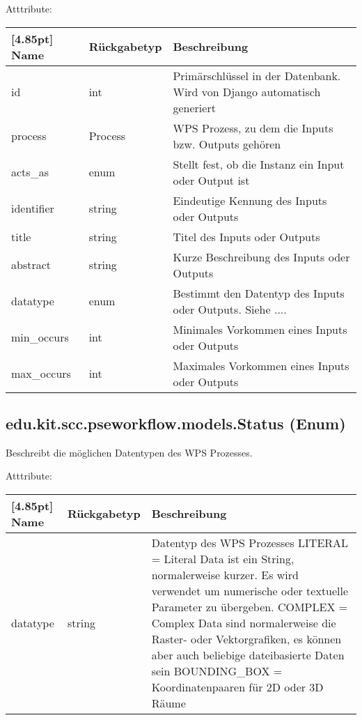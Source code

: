 			Atttribute:
			\begin{center}
				\setlength\tabcolsep{5pt}
				\renewcommand{\arraystretch}{1.5}
				
				\begin{tabularx}{\textwidth}{|l|l|X|}
					\hline
					\rowcolor[gray]{0.75}[4.85pt]
					Name & Rückgabetyp & Beschreibung \\ \hline 
					id & int & Primärschlüssel in der Datenbank. Wird von Django automatisch generiert \\ \hline
					process & Process & WPS Prozess, zu dem die Inputs bzw. Outputs gehören \\ \hline
					acts_as & enum & Stellt fest, ob die Instanz ein Input oder Output ist \\ \hline
					identifier & string & Eindeutige Kennung des Inputs oder Outputs \\ \hline
					title & string & Titel des Inputs oder Outputs \\ \hline
					abstract & string & Kurze Beschreibung des Inputs oder Outputs \\ \hline
					datatype & enum & Bestimmt den Datentyp des Inputs oder Outputs. 
					Siehe .... \\ \hline
					min\_occurs & int & Minimales Vorkommen eines Inputs oder Outputs \\ \hline
					max\_occurs & int & Maximales Vorkommen eines Inputs oder Outputs \\ \hline
				\end{tabularx}
			\end{center}
			
        \subsection{edu.kit.scc.pseworkflow.models.Status (Enum)}	
			Beschreibt die möglichen Datentypen des WPS Prozesses. \newline
			
			Atttribute:
			\begin{center}
				\setlength\tabcolsep{5pt}
				\renewcommand{\arraystretch}{1.5}
				
				\begin{tabularx}{\textwidth}{|l|l|X|}
					\hline
					\rowcolor[gray]{0.75}[4.85pt]
					Name & Rückgabetyp & Beschreibung \\ \hline 
	           		datatype & string & Datentyp des WPS Prozesses\newline
	           		LITERAL =  Literal Data ist ein String, normalerweise kurzer. Es wird verwendet um numerische oder textuelle Parameter zu übergeben.   \newline
	           		COMPLEX = Complex Data sind normalerweise die Raster- oder Vektorgrafiken, es können aber auch beliebige dateibasierte Daten sein\newline 
	           		BOUNDING_BOX = Koordinatenpaaren für 2D oder 3D Räume \\ \hline
				\end{tabularx}
			\end{center}

